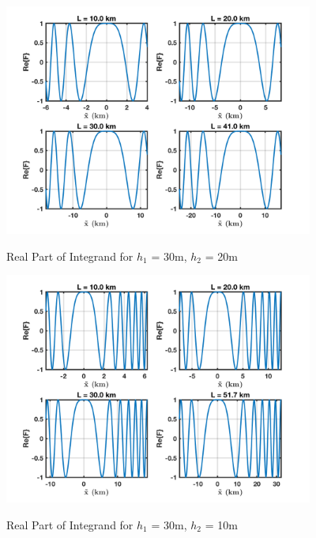 \begin{figure}[H]
  \begin{center}
\includegraphics[width=4in]{../media/analysis/phaseVariation_30_20}
  \end{center}
  \renewcommand{\baselinestretch}{1} \small\normalsize
  \begin{quote}
  \caption[Real Part of Integrand for $h_1$ = 30m, $h_2$ = 20m]{ Real Part of Integrand for $h_1$ = 30m, $h_2$ = 20m\label{mp_fig:4}}
  \end{quote}
\end{figure}
\renewcommand{\baselinestretch}{2} \small\normalsize

\begin{figure}[H]
  \begin{center}
\includegraphics[width=4in]{../media/analysis/phaseVariation_30_50}
  \end{center}
  \renewcommand{\baselinestretch}{1} \small\normalsize
  \begin{quote}
  \caption[Real Part of Integrand for $h_1$ = 30m, $h_2$ = 50m]{ Real Part of Integrand for $h_1$ = 30m, $h_2$ = 10m\label{mp_fig:5}}
  \end{quote}
\end{figure}
\renewcommand{\baselinestretch}{2} \small\normalsize

